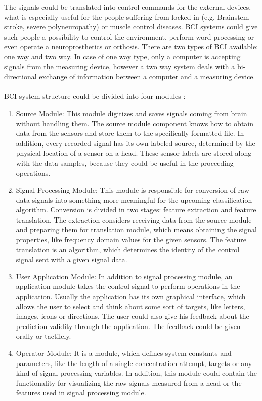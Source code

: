 \documentclass[12pt]{article}
\theoremstyle{definition}
\begin{document}
The signals could be translated into control commands for the external devices, what is especially useful for the people suffering from locked-in (e.g. Brainstem stroke, severe polyneuropathy) or muscle control diseases.  BCI systems could give such people a possibility to control the environment, perform word processing or even operate a neuroprosthetics or orthosis.
There are two types of BCI available: one way and two way. In case of one way type, only a computer is accepting signals from the measuring device, however a two way system deals with a bi-directional exchange of information between a computer and a measuring device. \cite{bci_shivangi}
\paragraph{}
BCI system structure could be divided into four modules \cite{bci_shivangi}:
\begin{enumerate}
\item Source Module:
This module digitizes and saves signals coming from brain without handling them. The source module component knows how to obtain data from the sensors and store them to the specifically formatted file. In addition, every recorded signal has its own labeled source, determined by the physical location of a sensor on a head. These sensor labels are stored along with the data samples, because they could be useful in the proceeding operations. 
\item Signal Processing Module:
This module is responsible for conversion of raw data signals into something more meaningful for the upcoming classification algorithm. Conversion is divided in two stages: feature extraction and feature translation. The extraction considers receiving data from the source module and preparing them for translation module, which means obtaining the signal properties, like frequency domain values for the given sensors. The feature translation is an algorithm, which determines the identity of the control signal sent with a given signal data.
\item User Application Module:
In addition to signal processing module, an application module takes the control signal to perform operations in the application. Usually the application has its own graphical interface, which allows the user to select and think about some sort of targets, like letters, images, icons or directions. The user could also give his feedback about the prediction validity through the application. The feedback could be given orally or tactilely. 
\item Operator Module:
It is a module, which defines system constants and parameters, like the length of a single concentration attempt, targets or any kind of signal processing variables. In addition, this module could contain the functionality for visualizing the raw signals measured from a head or the features used in signal processing module.
\end{enumerate}
\end{document}
